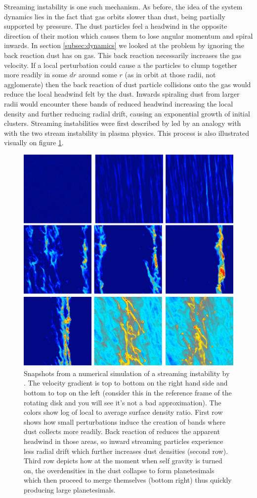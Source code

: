 \documentclass[12pt]{article}
\begin{document}
Streaming instability is one such mechanism. As before, the idea of the system dynamics lies in the fact that gas orbits slower than dust, being partially supported by pressure. The dust particles feel a headwind in the opposite direction of their motion which causes them to lose angular momentum and spiral inwards. In section \ref{subsec:dynamics} we looked at the problem by ignoring the back reaction dust has on gas. This back reaction necessarily increases the gas velocity. If a local perturbation could cause a the particles to clump together more readily in some $dr$ around some $r$ (as in orbit at those radii, not agglomerate) then the back reaction of dust particle collisions onto the gas would reduce the local headwind felt by the dust. Inwards spiraling dust from larger radii would encounter these bands of reduced headwind increasing the local density and further reducing radial drift, causing an exponential growth of initial clusters. Streaming instabilities were first described by \citet{Youdin05} led by an analogy with with the two stream instability in plasma physics. This process is also illustrated visually on figure \ref{fig:streaminginstabsim}.
\begin{figure}[htbp]
    \label{fig:streaminginstabsim}
    \centering
    \includegraphics[width=0.55\linewidth]{images/streaminginstabsim.png}
    \caption{Snapshots from a numerical simulation of a streaming instability by \cite{Simon16}. The velocity gradient is top to bottom on the right hand side and bottom to top on the left (consider this in the reference frame of the rotating disk and you will see it's not a bad approximation). The colors show log of local to average surface density ratio. First row shows how small perturbations induce the creation of bands where dust collects more readily. Back reaction of reduces the apparent headwind in those areas, so inward streaming particles experience less radial drift which further increases dust densities (second row). Third row depicts how at the moment when self gravity is turned on, the overdensities in the dust collapse to form planetesimals which then proceed to merge themselves (bottom right) thus quickly producing large planetesimals.}
\end{figure}
\end{document}
